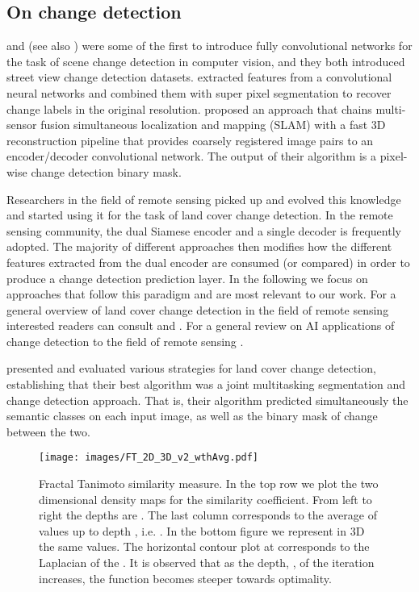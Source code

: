 \documentclass[times, 5p]{elsarticle}
\begin{document}
\subsection{On change detection} 

\cite{Sakurada2015ChangeDF} and \cite{Stent-RSS-16} (see also \citealt{DBLP:journals/corr/abs-1810-09111})  were some of the first to introduce fully convolutional networks for the task of scene change detection in computer vision, and they both introduced street view change detection datasets.  \cite{Sakurada2015ChangeDF} extracted features from a convolutional neural networks and combined them with super pixel segmentation to recover change labels in the original resolution. \cite{Stent-RSS-16} proposed an approach that chains  multi-sensor fusion simultaneous localization and mapping (SLAM) 
with a fast 3D reconstruction pipeline that provides coarsely registered image pairs to an encoder/decoder convolutional network. The output of their algorithm is a pixel-wise change detection binary mask. 
   
Researchers in the field of remote sensing 
 picked up and evolved this  knowledge and started using it for the task of land cover change detection. 
In the remote sensing community, the dual Siamese encoder and a single decoder is frequently adopted. The majority of different approaches then modifies how the different features extracted from the dual encoder are consumed (or compared) in order to produce a change detection prediction layer. 
 In the following we focus on approaches that follow this paradigm and are most relevant to our work. For a general overview of land cover change detection in the field of remote sensing interested readers can consult \cite{HUSSAIN201391} and \cite{6345345gdfGHTff}. For a  general review  on AI applications of change detection to the field of remote sensing \cite{Shi_2020}.  
 
 \cite{CAYEDAUDT2019102783} presented and evaluated various strategies for land cover change detection, establishing that their best algorithm was a joint  multitasking segmentation and change detection approach. That is, their algorithm predicted simultaneously the semantic  classes on each input image, as well as the binary mask of change between the two. 
 


\begin{figure*}
\centering
\texttt{[image: images/FT\_2D\_3D\_v2\_wthAvg.pdf]}
\caption{Fractal Tanimoto similarity measure. In the top row we plot the two dimensional density maps for the  similarity coefficient. 
From left to right  the depths are . The last column corresponds to the average of values up to depth , i.e. . In the bottom figure we represent in 3D the same values. The horizontal contour plot at  corresponds to the Laplacian of the . It is observed that as the depth, , of the iteration increases, the function becomes steeper towards optimality. } 
\label{FracTanmt2D3D}
\end{figure*}
 
\end{document}
